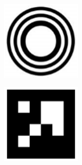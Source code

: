 \begin{figure}[htb]
\begin{minipage}[t]{0.33\linewidth}
		\label{fig:2-8b} 
	\end{minipage}
	\begin{minipage}[t]{0.33\linewidth} 
		\centering
		\includegraphics[width=\columnwidth]{figures/2-8c.png} 
		\label{fig:2-8c} 
	\end{minipage}
	\begin{minipage}[t]{0.33\linewidth}
		\centering
		\includegraphics[width=\columnwidth]{figures/2-8d.png} 

\end{minipage}
\end{figure}
